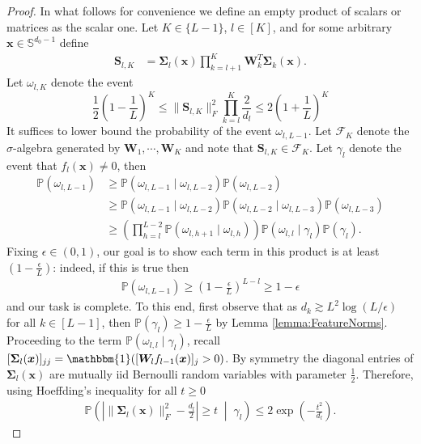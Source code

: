 \documentclass{article}
\theoremstyle{definition}
\renewcommand{\P}{\mathbb{P}}
\newcommand{\mc}{\mathcal}
\renewcommand{\S}{\mathbb{S}}
\def\vx{{\bm{x}}}
\def\mS{{\bm{S}}}
\def\mW{{\bm{W}}}
\def\mSigma{{\bm{\Sigma}}}
\begin{document}
\begin{proof}
    In what follows for convenience we define an empty product of scalars or matrices as the scalar one.
    Let $K \in \{L - 1\}$, $l \in [K]$, and for some arbitrary $\vx \in \S^{d_0-1}$ define
    \begin{align*}
        \mS_{l,K} &= \mSigma_l(\vx) \prod_{k = l+1}^{K} \mW_k^T \bm{\Sigma}_k(\vx).
    \end{align*}
    Let $\omega_{l,K}$ denote the event
    \begin{equation}\label{eq:frob-norm-K}
    \frac{1}{2} \left(1 - \frac{1}{L}\right)^K \leq \|\mS_{l, K}\|_F^2\prod_{k = l}^K \frac{2}{d_l} \leq 2\left(1 + \frac{1}{L}\right)^K
    \end{equation}
    It suffices to lower bound the probability of the event $\omega_{l, L-1}$. Let $\mc{F}_{K}$ denote the $\sigma$-algebra generated by $\mW_1, \cdots, \mW_{K}$ and note that $\mS_{l,K} \in \mc{F}_{K}$. Let $\gamma_l$ denote the event that $f_l(\vx) \neq 0$, then
    \begin{align*}
        \P(\omega_{l, L-1}) &\geq \P(\omega_{l, L-1} \mid \omega_{l, L-2} ) \P(\omega_{l, L-2})\\
        &\geq \P(\omega_{l, L-1} \mid \omega_{l, L-2} ) \P(\omega_{l, L-2} \mid \omega_{l, L-3})\P(\omega_{l, L-3})\\
        & \geq \left(\prod_{h = l}^{L-2} \P(\omega_{l, h+1} \mid \omega_{l, h}) \right) \P(\omega_{l,l} \mid \gamma_l) \P(\gamma_l).
    \end{align*}
    Fixing $\epsilon \in (0,1)$, our goal is to show each term in this product is at least $(1 - \tfrac{\epsilon}{L})$: indeed, if this is true then
    \begin{align*}
        \P(\omega_{l, L-1}) \geq \left(1 - \frac{\epsilon}{L} \right)^{L-l} \geq 1 - \epsilon
    \end{align*}
    and our task is complete. To this end, first observe that as $d_k \gtrsim L^2 \log(L / \epsilon)$ for all $k \in [L-1]$, then $\P(\gamma_l) \geq 1 - \tfrac{\epsilon}{L}$ by Lemma \ref{lemma:FeatureNorms}. Proceeding to the term $\P(\omega_{l,l} \mid \gamma_l)$, recall $[\bm{\Sigma}_l(\vx)]_{jj}=\mathbbm{1}([\mW_l f_{l-1}(\vx)]_j>0)$. By symmetry the diagonal entries of $\bm{\Sigma}_l(\vx)$ are mutually iid Bernoulli random variables with parameter $\frac{1}{2}$. Therefore, using Hoeffding's inequality for all $t \geq 0$ 
    \begin{align*}          
    \P\left(\left|\|\bm{\Sigma}_l(\vx)\|_F^2 - \frac{d_l}{2}\right| \geq t \; \middle|\; \gamma_l \right) \leq 2 \exp\left(-\frac{t^2}{d_l}\right).

\end{align*}
\end{proof}
\end{document}
